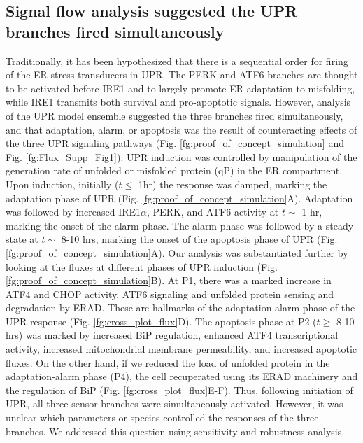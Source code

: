 \documentclass[fleqn,10pt]{wlscirep}
\begin{document}
\subsection*{Signal flow analysis suggested the UPR branches fired simultaneously}
Traditionally, it has been hypothesized that there is a sequential order for firing of the ER stress transducers in UPR.
The PERK and ATF6 branches are thought to be activated before IRE1 \cite{szegezdi2006mediators} and to largely promote ER adaptation to misfolding, while IRE1 transmits both survival and pro-apoptotic signals.
However, analysis of the UPR model ensemble suggested the three branches fired simultaneously, and that adaptation, alarm, or apoptosis was the result of counteracting effects of the three UPR signaling pathways (Fig. \ref{fg:proof_of_concept_simulation} and Fig. \ref{fg:Flux_Supp_Fig1}). UPR induction was controlled by manipulation of the generation rate of unfolded or misfolded protein (qP) in the ER compartment.
Upon induction, initially ($t\leq$ 1hr) the response was damped, marking the adaptation phase of UPR (Fig. \ref{fg:proof_of_concept_simulation}A).
Adaptation was followed by increased IRE1$\alpha$, PERK, and ATF6 activity at $t\sim$ 1 hr, marking the onset of the alarm phase.
The alarm phase was followed by a steady state at $t\sim$ 8-10 hrs, marking the onset of the apoptosis phase of UPR (Fig. \ref{fg:proof_of_concept_simulation}A).
Our analysis was substantiated further by looking at the fluxes at different phases of UPR induction (Fig. \ref{fg:proof_of_concept_simulation}B).
At P1, there was a marked increase in ATF4 and CHOP activity, ATF6 signaling and unfolded protein sensing and degradation by ERAD.
These are hallmarks of the adaptation-alarm phase of the UPR response (Fig. \ref{fg:cross_plot_flux}D).
The apoptosis phase at P2 ($t\geq$ 8-10 hrs) was marked by increased BiP regulation, enhanced ATF4 transcriptional activity, increased mitochondrial membrane permeability, and increased apoptotic fluxes.
On the other hand, if we reduced the load of unfolded protein in the adaptation-alarm phase (P4), the cell recuperated using its ERAD machinery and the regulation of BiP (Fig. \ref{fg:cross_plot_flux}E-F).
Thus, following initiation of UPR, all three sensor branches were simultaneously activated. However, it was unclear which parameters or species controlled the responses of the three branches.
We addressed this question using sensitivity and robustness analysis.
\end{document}
